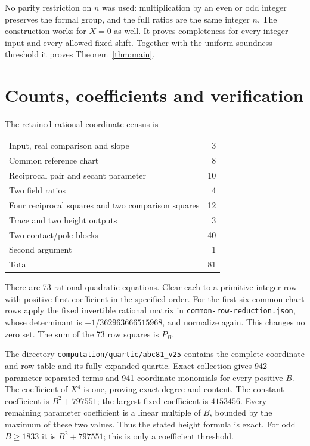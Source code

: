 \documentclass[11pt,a4paper]{article}
\begin{document}
No parity restriction on $n$ was used: multiplication by an even or
odd integer preserves the formal group, and the full ratios are the
same integer $n$. The construction works for $X=0$ as well. It proves
completeness for every integer input and every allowed fixed shift.
Together with the uniform soundness threshold it proves
Theorem~\ref{thm:main}.

\section{Counts, coefficients and verification}
The retained rational-coordinate census is
\begin{center}\begin{tabular}{lr}\toprule
Input, real comparison and slope&3\\
Common reference chart&8\\
Reciprocal pair and secant parameter&10\\
Two field ratios&4\\
Four reciprocal squares and two comparison squares&12\\
Trace and two height outputs&3\\
Two contact/pole blocks&40\\
Second argument&1\\\midrule Total&81\\\bottomrule
\end{tabular}\end{center}
There are 73 rational quadratic equations. Clear each to a primitive
integer row with positive first coefficient in the specified order.
For the first six common-chart rows apply the fixed invertible
rational matrix in \texttt{common-row-reduction.json}, whose
determinant is $-1/362963666515968$, and normalize again. This changes
no zero set. The sum of the 73 row squares is $P_B$.

The directory \texttt{computation/quartic/abc81\_v25} contains the
complete coordinate and row table and its fully expanded quartic.
Exact collection gives 942 parameter-separated terms and 941
coordinate monomials for every positive $B$. The coefficient of
$X^4$ is one, proving exact degree and content. The constant
coefficient is $B^2+797551$; the largest fixed coefficient is
$4153456$. Every remaining parameter coefficient is a linear
multiple of $B$, bounded by the maximum of these two values.
Thus the stated height formula is exact. For odd $B\ge1833$ it
is $B^2+797551$; this is only a coefficient threshold.
\end{document}
